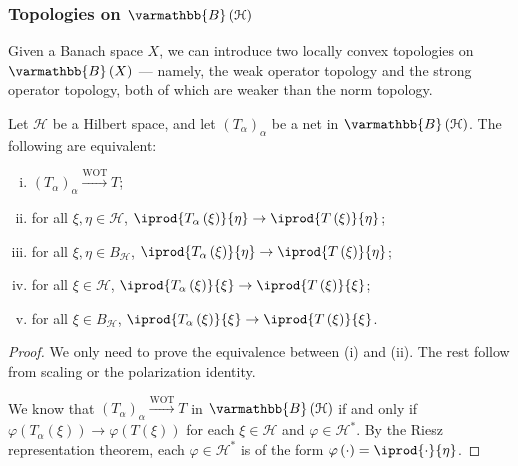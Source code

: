 \documentclass[10pt]{mypackage}
\renewcommand*{\mathbb}[1]{\varmathbb{#1}}
\newcommand{\B}{\mathbb{B}}
\begin{document}
\subsubsection{Topologies on $\B\left(\mathcal{H}\right)$}%
Given a Banach space $X$, we can introduce two locally convex topologies on $\B\left(X\right)$ --- namely, the weak operator topology and the strong operator topology, both of which are weaker than the norm topology.
\begin{lemma}
  Let $\mathcal{H}$ be a Hilbert space, and let $\left(T_{\alpha}\right)_{\alpha}$ be a net in $\B\left(\mathcal{H}\right)$. The following are equivalent:
  \begin{enumerate}[(i)]
    \item $\left(T_{\alpha}\right)_{\alpha}\xrightarrow{\text{WOT}}T$;
    \item for all $\xi,\eta\in \mathcal{H}$, $ \iprod{T_{\alpha}\left(\xi\right)}{\eta}\rightarrow \iprod{T\left(\xi\right)}{\eta} $;
    \item for all $\xi,\eta\in B_{\mathcal{H}}$, $ \iprod{T_{\alpha}\left(\xi\right)}{\eta}\rightarrow \iprod{T\left(\xi\right)}{\eta} $;
    \item for all $\xi\in \mathcal{H}$, $ \iprod{T_{\alpha}\left(\xi\right)}{\xi} \rightarrow \iprod{T\left(\xi\right)}{\xi} $;
    \item for all $\xi\in B_{\mathcal{H}}$, $ \iprod{T_{\alpha}\left(\xi\right)}{\xi} \rightarrow \iprod{T\left(\xi\right)}{\xi} $.
  \end{enumerate}
\end{lemma}
\begin{proof}
  We only need to prove the equivalence between (i) and (ii). The rest follow from scaling or the polarization identity.\newline

  We know that $\left(T_{\alpha}\right)_{\alpha}\xrightarrow{\text{WOT}}T$ in $\B\left(\mathcal{H}\right)$ if and only if $\varphi\left(T_{\alpha}\left(\xi\right)\right)\rightarrow \varphi\left(T\left(\xi\right)\right)$ for each $\xi\in \mathcal{H}$ and $\varphi\in \mathcal{H}^{\ast}$. By the Riesz representation theorem, each $\varphi\in \mathcal{H}^{\ast}$ is of the form $\varphi\left(\cdot\right) = \iprod{\cdot}{\eta}$.
\end{proof}
\end{document}
